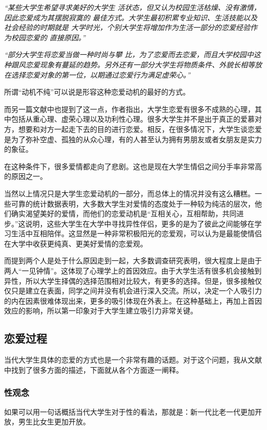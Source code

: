 \documentclass[UTF8,a4paper]{ctexart}
\begin{document}
\textsl{“某些大学生希望寻求美好的大学生 活状态，但又认为校园生活枯燥、没有激情，因此恋爱成为其摆脱寂寞的 最佳方式。大学生最初积累专业知识、生活技能以及社会经验的时期就是 大学时光，个别大学生将增加作为生活一部分的恋爱经验作为校园恋爱的 直接原因。”}

\textit{
“部分大学生将恋爱当做一种时尚与攀 比，为了恋爱而去恋爱，而且大学校园中这种跟风恋爱现象有蔓延的趋势。另外还有一部分大学生将物质条件、外貌长相等放在选择恋爱对象的第一位，以期通过恋爱行为满足虚荣心。”}

所谓“动机不纯”可以说是形容这种恋爱动机的最好的方式。

而另一篇文献中也提到了这一点，作者指出，大学生恋爱有很多不成熟的心理，其中包括从重心理、虚荣心理以及功利性心理。很多大学生并不是出于真正的爱慕对方，想要和对方一起走下去的目的进行恋爱。相反，在很多情况下，大学生谈恋爱是为了弥补空虚、孤独的从众心理，有的人甚至认为拥有男朋友或者女朋友是实力的象征。

在这种条件下，很多爱情都走向了悲剧。这也是现在大学生情侣之间分手率非常高的原因之一。

当然以上情况只是大学生恋爱动机的一部分，而总体上的情况并没有这么糟糕。一些可靠的统计数据表明，大多数大学生对爱情的态度处于一种较为纯洁的层次，他们确实渴望美好的爱情，而他们的恋爱动机是“互相关心，互相帮助，共同进步。”这说明，这些大学生在大学中寻找异性伴侣，更多的是为了彼此之间能够在学习生活中互相陪伴。这显然是一种非常积极阳光的恋爱观，可以认为是最能使情侣在大学中收获更纯真、更美好爱情的恋爱观。

而提到两个人是处于什么原因走到一起，大多数调查研究表明，很大程度上是由于两人“一见钟情”。这体现了心理学上的首因效应。由于大学生活有很多机会接触到异性，所以大学生择偶的选择范围相对比较大，有更多的选择。但是，很多接触仅仅只是建立在表面，同学之间并没有机会进行深入交流。所以，决定一个人吸引力的内在因素很难体现出来，更多的吸引体现在外表上。在这种基础上，再加上首因效应的影响，所以第一印象对于大学生建立吸引力非常关键。

\subsection{恋爱过程}
当代大学生具体的恋爱的方式也是一个非常有趣的话题。对于这个问题，我从文献中找到了很多方面的描述，下面就从各个方面逐一阐释。

\subsubsection{性观念}
如果可以用一句话概括当代大学生对于性的看法，那就是：新一代比老一代更加开放，男生比女生更加开放。
\end{document}
